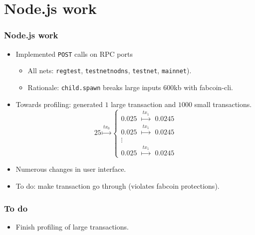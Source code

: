 \section{Node.js work}
\begin{frame}[fragile]
\frametitle{Node.js work}
\begin{itemize}
\item Implemented \verb|POST| calls on RPC ports
\begin{itemize}
\item All nets: \verb|regtest|, \verb|testnetnodns|, \verb|testnet|, \verb|mainnet|). 
\item Rationale: \verb|child.spawn| breaks large inputs $600$kb with fabcoin-cli.
\end{itemize}
\item Towards profiling: generated $1$ large transaction and $1000$ small transactions.
\[
25 \stackrel{tx_0}{\mapsto} \left\{\begin{array}{lll}
0.025 & \stackrel{tx_1}{\mapsto}& 0.0245 \\
0.025 & \stackrel{tx_1}{\mapsto}& 0.0245\\
\vdots\\
0.025 & \stackrel{tx_1}{\mapsto}& 0.0245
\end{array} \right.
\]
\item Numerous changes in user interface.
\item To do: make transaction go through (violates fabcoin protections).
\end{itemize}

\end{frame}

\begin{frame}
\frametitle{To do}
\begin{itemize}
\item Finish profiling of large transactions.
\end{itemize}
\end{frame}